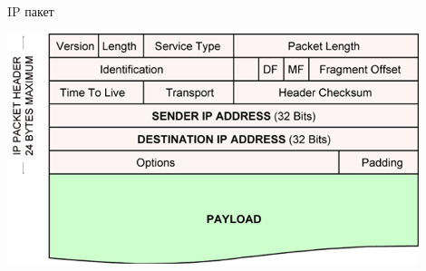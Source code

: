 \begin{frame}{IP пакет}

	\center\includegraphics[width=0.9\textwidth]{../../slides/networking/net_IP_head.png}

\end{frame}


